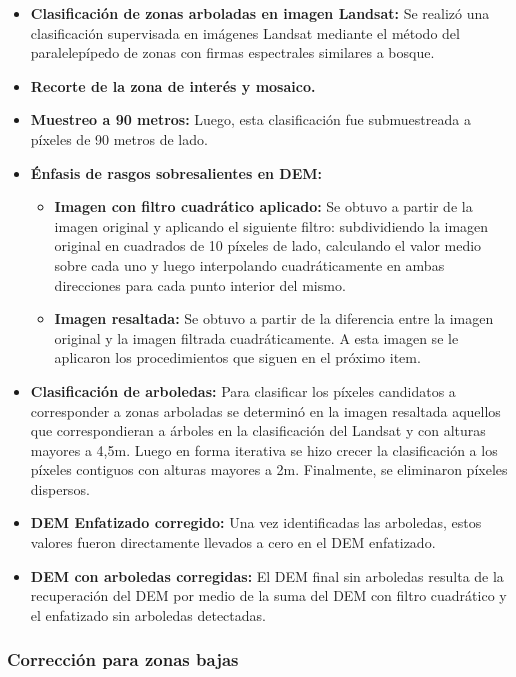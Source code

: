 \documentclass[10pt,a4paper, twoside]{report}
\begin{document}
\begin{itemize}
	\item \textbf{Clasificación de zonas arboladas en imagen Landsat:} Se realizó una clasificación supervisada en imágenes Landsat mediante el método del paralelepípedo de zonas con firmas espectrales similares a bosque.
	\item \textbf{Recorte de la zona de interés y mosaico.}
	\item \textbf{Muestreo a 90 metros:} Luego, esta clasificación fue submuestreada a píxeles de 90 metros de lado. 
	\item \textbf{Énfasis de rasgos sobresalientes en DEM:}	
	\begin{itemize}
		\item \textbf{Imagen con filtro cuadrático aplicado:} Se obtuvo a partir de la imagen original y aplicando el siguiente filtro: subdividiendo la imagen original en cuadrados de 10 píxeles de lado, calculando el valor medio sobre cada uno y luego interpolando cuadráticamente en ambas direcciones para cada punto interior del mismo. 
		\item \textbf{Imagen resaltada:} Se obtuvo a partir de la diferencia entre la imagen original y la imagen filtrada cuadráticamente. A esta imagen se le aplicaron los procedimientos que siguen en el próximo item.
	\end{itemize}
	\item \textbf{Clasificación de arboledas:} Para clasificar los píxeles candidatos a corresponder a zonas arboladas se determinó en la imagen resaltada aquellos que correspondieran a árboles en la clasificación del Landsat y con alturas mayores a 4,5m. Luego en forma iterativa se hizo crecer la clasificación a los píxeles contiguos con alturas mayores a 2m. Finalmente, se eliminaron píxeles dispersos.
	\item \textbf{DEM Enfatizado corregido:} Una vez identificadas las arboledas, estos valores fueron directamente llevados a cero en el DEM enfatizado.	
	\item \textbf{DEM con arboledas corregidas:} El DEM final sin arboledas resulta de la recuperación del DEM por medio de la suma del DEM con filtro cuadrático y el enfatizado sin arboledas detectadas.	
\end{itemize}

\subsubsection{Corrección para zonas bajas}
\end{document}
